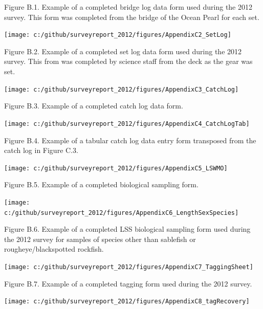 \documentclass[12pt]{article}\usepackage[]{graphicx}\usepackage[]{color}
\begin{document}
\begin{appendices}
Figure B.1. Example of a completed bridge log data form used during the 2012 survey. This form was completed from the bridge of the Ocean Pearl for each set.

\clearpage
\begin{center}\texttt{[image: c:/github/surveyreport\_2012/figures/AppendixC2\_SetLog]} \end{center}

Figure B.2. Example of a completed set log data form used during the 2012 survey. This from was completed by science staff from the deck as the gear was set.

\clearpage
\begin{center}\texttt{[image: c:/github/surveyreport\_2012/figures/AppendixC3\_CatchLog]} \end{center}

Figure B.3. Example of a completed catch log data form. \clearpage
\begin{center}\texttt{[image: c:/github/surveyreport\_2012/figures/AppendixC4\_CatchLogTab]} \end{center}

Figure B.4. Example of a tabular catch log data entry form transposed from the catch log in Figure C.3.

\clearpage
\begin{center}\texttt{[image: c:/github/surveyreport\_2012/figures/AppendixC5\_LSWMO]} \end{center}

Figure B.5. Example of a completed biological sampling form.

\clearpage
\begin{center}\texttt{[image: c:/github/surveyreport\_2012/figures/AppendixC6\_LengthSexSpecies]} \end{center}

Figure B.6. Example of a completed LSS biological sampling form used during the 2012 survey for samples of species other than sablefish or rougheye/blackspotted rockfish.

\clearpage
\begin{flushleft}\texttt{[image: c:/github/surveyreport\_2012/figures/AppendixC7\_TaggingSheet]} \end{flushleft}

Figure B.7. Example of a completed tagging form used during the 2012 survey.

\clearpage
\begin{flushleft}\texttt{[image: c:/github/surveyreport\_2012/figures/AppendixC8\_tagRecovery]} \end{flushleft}


\end{appendices}
\end{document}
